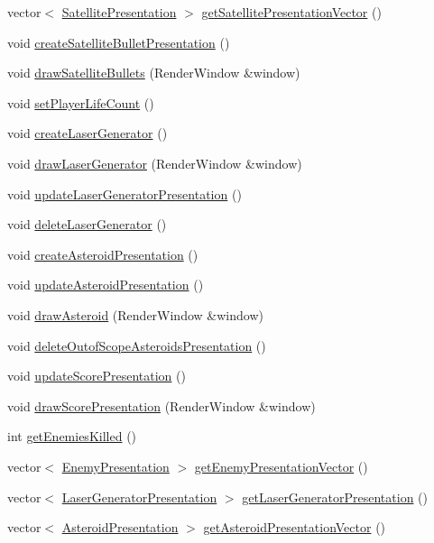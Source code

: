 \begin{DoxyCompactItemize}
\item 
vector$<$ \hyperlink{class_satellite_presentation}{Satellite\+Presentation} $>$ \hyperlink{class_game_presentation_a8bb8847556bd4977479df73eec79b2eb}{get\+Satellite\+Presentation\+Vector} ()
\item 
void \hyperlink{class_game_presentation_a172770f122258cba73e1dbff88d27ea5}{create\+Satellite\+Bullet\+Presentation} ()
\item 
void \hyperlink{class_game_presentation_a6ee175034a6d067f2755c75c753f07a0}{draw\+Satellite\+Bullets} (Render\+Window \&window)
\item 
void \hyperlink{class_game_presentation_a5a329f0403011b464c26218eeff38606}{set\+Player\+Life\+Count} ()
\item 
void \hyperlink{class_game_presentation_ac20ace0966aacedc817bdafd6eb6f1ba}{create\+Laser\+Generator} ()
\item 
void \hyperlink{class_game_presentation_a8c0ec310f4105564f11d1b48779e3941}{draw\+Laser\+Generator} (Render\+Window \&window)
\item 
void \hyperlink{class_game_presentation_aa6d8e5e91de557ac2c39bb51e032f14f}{update\+Laser\+Generator\+Presentation} ()
\item 
void \hyperlink{class_game_presentation_aebd299a3aa0c8e7a06d63f5cbc808c7d}{delete\+Laser\+Generator} ()
\item 
void \hyperlink{class_game_presentation_a4c3e9bf3b8866eaff58c5eb8c83f3245}{create\+Asteroid\+Presentation} ()
\item 
void \hyperlink{class_game_presentation_a669fe49aef6332f78a23802cafa6681c}{update\+Asteroid\+Presentation} ()
\item 
void \hyperlink{class_game_presentation_adbeb1c114932cdab67120bd6fe6a5da5}{draw\+Asteroid} (Render\+Window \&window)
\item 
void \hyperlink{class_game_presentation_acd19622d7ee0ae8b898f5805ae94f2b4}{delete\+Outof\+Scope\+Asteroids\+Presentation} ()
\item 
void \hyperlink{class_game_presentation_ab2cf74842583bf5b63e5973fb8b657be}{update\+Score\+Presentation} ()
\item 
void \hyperlink{class_game_presentation_a38bab53e3d75b244e14ed2d7c2710fa0}{draw\+Score\+Presentation} (Render\+Window \&window)
\item 
int \hyperlink{class_game_presentation_ab09fbeaf4a3dfd753f1bce5cdd78969e}{get\+Enemies\+Killed} ()
\item 
vector$<$ \hyperlink{class_enemy_presentation}{Enemy\+Presentation} $>$ \hyperlink{class_game_presentation_a903a8e09c19324b2380b5073abd570f0}{get\+Enemy\+Presentation\+Vector} ()
\item 
vector$<$ \hyperlink{class_laser_generator_presentation}{Laser\+Generator\+Presentation} $>$ \hyperlink{class_game_presentation_a6da88c7baf912bccf09f274b6a5ae7b6}{get\+Laser\+Generator\+Presentation} ()
\item 
vector$<$ \hyperlink{class_asteroid_presentation}{Asteroid\+Presentation} $>$ \hyperlink{class_game_presentation_a28a7d4fb65413d6a10b960721aaca0d2}{get\+Asteroid\+Presentation\+Vector} ()
\end{DoxyCompactItemize}
